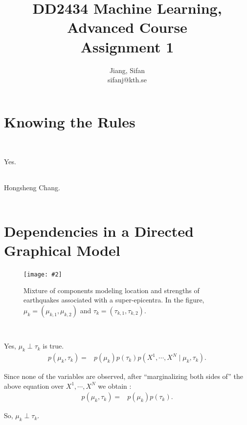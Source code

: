\documentclass[11pt]{extarticle}
\title{
    DD2434 Machine Learning, Advanced Course \\
    {\Large Assignment 1}
}
\author{
    Jiang, Sifan \\
	sifanj@kth.se \\
}
\newcommand{\0}{\mathbf{0}}
\renewcommand{\(}{\left(}
\renewcommand{\)}{\right)}
\theoremstyle{definition}
\newcommand{\image}[3]{
	\begin{figure}[!ht]
		\centering
	    \texttt{[image: \#2]}
		\caption{#3}
		\label{fig:#2}
	\end{figure}
}
\begin{document}
\maketitle
\tableofcontents
\lstlistoflistings

\newpage
\section{Knowing the Rules}
\noindent{} \\
\par Yes. \\

\noindent{} \\
\par Hongsheng Chang. \\

\noindent{} \\


\section{Dependencies in a Directed Graphical Model}
\image{0.5}{Q2_2}{Mixture of components modeling location and strengths of earthquakes associated with a super-epicentra. In the figure, $\mu_{k} = (\mu_{k,1}, \mu_{k,2})$ and $\tau_{k} = (\tau_{k,1}, \tau_{k,2})$.}
\noindent{} \\
\par Yes, $\mu_{k} \perp \tau_{k}$ is true.
\begin{align*}
    p(\mu_{k}, \tau_{k}) =& p(\mu_{k})p(\tau_{k})p\left(X^{1}, \cdots, X^{N} \mid \mu_{k}, \tau_{k}\right).
\end{align*}
\par Since none of the variables are observed, after ``marginalizing both sides of'' the above equation over $X^{1}, \cdots, X^{N}$ we obtain \cite{Bishop}:
\begin{align*}
    p(\mu_{k}, \tau_{k}) =& p(\mu_{k})p(\tau_{k}).
\end{align*}
\par So, $\mu_{k} \perp \tau_{k}$. \\
\end{document}
